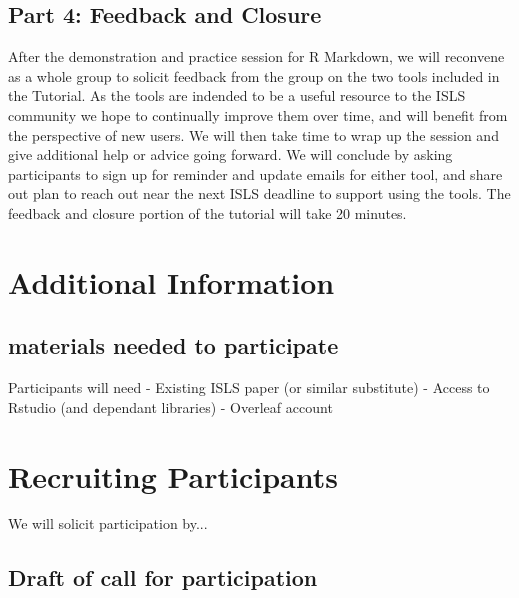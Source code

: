 \documentclass{article}
\begin{document}



\subsection{Part 4: Feedback and Closure}
After the demonstration and practice session for R Markdown, we will reconvene as a whole group to solicit feedback from the group on the two tools included in the Tutorial. As the tools are indended to be a useful resource to the ISLS community we hope to continually improve them over time, and will benefit from the perspective of new users. We will then take time to wrap up the session and give additional help or advice going forward. We will conclude by asking participants to sign up for reminder and update emails for either tool, and share out plan to reach out near the next ISLS deadline to support using the tools. The feedback and closure portion of the tutorial will take 20 minutes.



\section{Additional Information}
\subsection{materials needed to participate}
Participants will need
	- Existing ISLS paper (or similar substitute)
	- Access to Rstudio (and dependant libraries)
	- Overleaf account

\section{Recruiting Participants}
We will solicit participation by...
\subsection{Draft of call for participation }



\end{document}
